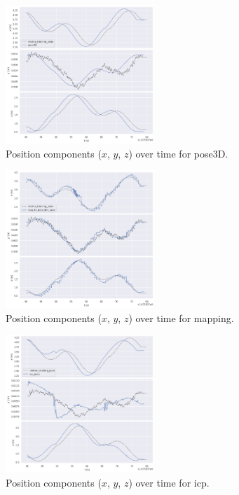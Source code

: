 \documentclass[11pt]{article}
\begin{document}
\begin{figure}[H]
    \centering
    \includegraphics[width=0.5\textwidth]{figures/evo_pose3D_xyz.png}
    \caption{Position components ($x$, $y$, $z$) over time for pose3D.}
    \label{fig:pose3D_xyz}
\end{figure}
\begin{figure}[H]
    \centering
    \includegraphics[width=0.5\textwidth]{figures/evo_mapping_xyz.png}
    \caption{Position components ($x$, $y$, $z$) over time for mapping.}
    \label{fig:mapping_xyz}
\end{figure}
\begin{figure}[H]
    \centering
    \includegraphics[width=0.5\textwidth]{figures/evo_icp_xyz.png}
    \caption{Position components ($x$, $y$, $z$) over time for icp.}
    \label{fig:icp_xyz}
\end{figure}
\end{document}
